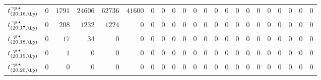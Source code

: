 \begin{tabular}{r|rrrrrrrrrrrrrrrrrrrrr}
  $t^{\neg p \, \star}_{(20,16,\Lp)}$ & $0$ & $1791$ & $24606$ & $62736$ & $41600$ & $0$ & $0$ & $0$ & $0$ & $0$ & $0$ & $0$ & $0$ & $0$ & $0$ & $0$ & $0$ & $0$ & $0$ & $0$ & $0$ \\
  $t^{\neg p \, \star}_{(20,17,\Lp)}$ & $0$ & $208$ & $1232$ & $1224$ & $0$ & $0$ & $0$ & $0$ & $0$ & $0$ & $0$ & $0$ & $0$ & $0$ & $0$ & $0$ & $0$ & $0$ & $0$ & $0$ & $0$ \\
  $t^{\neg p \, \star}_{(20,18,\Lp)}$ & $0$ & $17$ & $34$ & $0$ & $0$ & $0$ & $0$ & $0$ & $0$ & $0$ & $0$ & $0$ & $0$ & $0$ & $0$ & $0$ & $0$ & $0$ & $0$ & $0$ & $0$ \\
  $t^{\neg p \, \star}_{(20,19,\Lp)}$ & $0$ & $1$ & $0$ & $0$ & $0$ & $0$ & $0$ & $0$ & $0$ & $0$ & $0$ & $0$ & $0$ & $0$ & $0$ & $0$ & $0$ & $0$ & $0$ & $0$ & $0$ \\
  $t^{\neg p \, \star}_{(20,20,\Lp)}$ & $0$ & $0$ & $0$ & $0$ & $0$ & $0$ & $0$ & $0$ & $0$ & $0$ & $0$ & $0$ & $0$ & $0$ & $0$ & $0$ & $0$ & $0$ & $0$ & $0$ & $0$ \\
\end{tabular}
